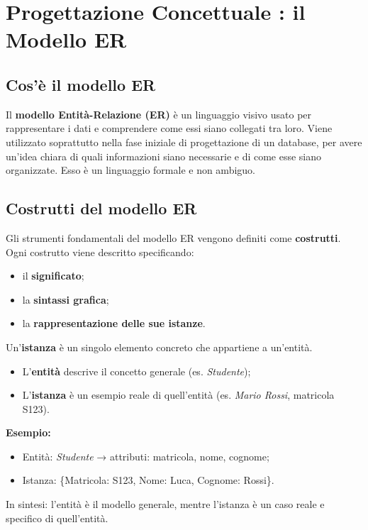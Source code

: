 \section{Progettazione Concettuale : il Modello ER}
\subsection{Cos'è il modello ER}
Il \textbf{modello Entità-Relazione (ER)} è un linguaggio visivo usato per 
rappresentare i dati e comprendere come essi siano collegati tra loro. 
Viene utilizzato soprattutto nella fase iniziale di progettazione di un database, 
per avere un'idea chiara di quali informazioni siano necessarie e di come esse siano 
organizzate.
Esso è un linguaggio formale e non ambiguo.

\subsection{Costrutti del modello ER}
Gli strumenti fondamentali del modello ER vengono definiti come \textbf{costrutti}.
Ogni costrutto viene descritto specificando:
\begin{itemize}
    \item il \textbf{significato};
    \item la \textbf{sintassi grafica};
    \item la \textbf{rappresentazione delle sue istanze}.
\end{itemize}

\begin{tcolorbox}[colback=yellow!20!white, colframe=black, title=Cos'è un'istanza]
Un’\textbf{istanza} è un singolo elemento concreto che appartiene a un'entità.  

\begin{itemize}
    \item L’\textbf{entità} descrive il concetto generale (es. \emph{Studente});  
    \item L’\textbf{istanza} è un esempio reale di quell’entità (es. \emph{Mario Rossi}, matricola S123).  
\end{itemize}

\textbf{Esempio:}  
\begin{itemize}
    \item Entità: \emph{Studente} → attributi: matricola, nome, cognome;  
    \item Istanza: \{Matricola: S123, Nome: Luca, Cognome: Rossi\}.  
\end{itemize}

In sintesi: l’entità è il modello generale, mentre l’istanza è un caso reale e specifico di quell’entità.
\end{tcolorbox}

